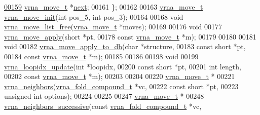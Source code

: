 \begin{DoxyCode}
\mbox{\hyperlink{group__neighbors_a181681bc3aab907d93e340df4777e759}{00159}}   \mbox{\hyperlink{group__neighbors_structvrna__move__s}{vrna\_move\_t}} *\mbox{\hyperlink{group__neighbors_a181681bc3aab907d93e340df4777e759}{next}}; 
00161 \};
00162 
00163 \mbox{\hyperlink{group__neighbors_structvrna__move__s}{vrna\_move\_t}} \mbox{\hyperlink{group__neighbors_gaeff6157398a2073f587416fa9ec94789}{vrna\_move\_init}}(\textcolor{keywordtype}{int} pos\_5, \textcolor{keywordtype}{int} pos\_3);
00164 
00168 \textcolor{keywordtype}{void} \mbox{\hyperlink{group__neighbors_gad085062ae3aa7ee20783debe4a906fad}{vrna\_move\_list\_free}}(\mbox{\hyperlink{group__neighbors_structvrna__move__s}{vrna\_move\_t}} *moves);
00169 
00176 \textcolor{keywordtype}{void}
00177 \mbox{\hyperlink{group__neighbors_gacdbc5f609b46aeb07d2c7e015677a1e0}{vrna\_move\_apply}}(\textcolor{keywordtype}{short}             *pt,
00178                 \textcolor{keyword}{const} \mbox{\hyperlink{group__neighbors_structvrna__move__s}{vrna\_move\_t}} *m);
00179 
00180 
00181 \textcolor{keywordtype}{void}
00182 \mbox{\hyperlink{group__neighbors_gabebc731deb0f194b8b666dab0f732c2a}{vrna\_move\_apply\_to\_db}}(\textcolor{keywordtype}{char}              *structure,
00183                       \textcolor{keyword}{const} \textcolor{keywordtype}{short}       *pt,
00184                       \textcolor{keyword}{const} \mbox{\hyperlink{group__neighbors_structvrna__move__s}{vrna\_move\_t}} *m);
00185 
00186 
00198 \textcolor{keywordtype}{void}
00199 \mbox{\hyperlink{group__neighbors_ga5ceb55ee56494b1f5b7aaa758cb722d1}{vrna\_loopidx\_update}}(\textcolor{keywordtype}{int}               *loopidx,
00200                     \textcolor{keyword}{const} \textcolor{keywordtype}{short}       *pt,
00201                     \textcolor{keywordtype}{int}               length,
00202                     \textcolor{keyword}{const} \mbox{\hyperlink{group__neighbors_structvrna__move__s}{vrna\_move\_t}} *m);
00203 
00204 
00220 \mbox{\hyperlink{group__neighbors_structvrna__move__s}{vrna\_move\_t}} *
00221 \mbox{\hyperlink{group__neighbors_gab1473d856b15da2120fe648977798ad5}{vrna\_neighbors}}(\mbox{\hyperlink{group__fold__compound_structvrna__fc__s}{vrna\_fold\_compound\_t}} *vc,
00222                \textcolor{keyword}{const} \textcolor{keywordtype}{short}          *pt,
00223                \textcolor{keywordtype}{unsigned} \textcolor{keywordtype}{int}         options);
00224 
00225 
00247 \mbox{\hyperlink{group__neighbors_structvrna__move__s}{vrna\_move\_t}} *
00248 \mbox{\hyperlink{group__neighbors_gae5aaa1c5a1f22e889843f3edbdd04714}{vrna\_neighbors\_successive}}(\textcolor{keyword}{const} \mbox{\hyperlink{group__fold__compound_structvrna__fc__s}{vrna\_fold\_compound\_t}}  *vc,

\end{DoxyCode}
